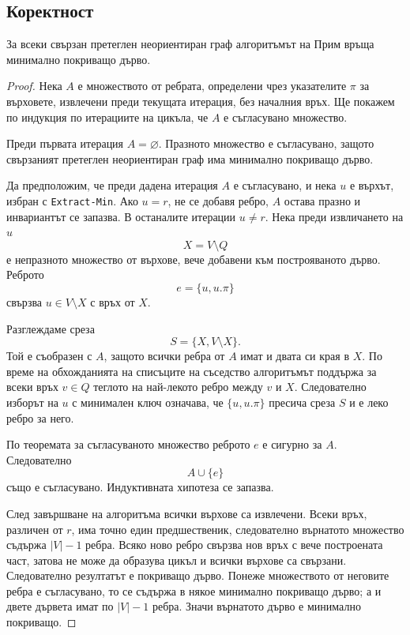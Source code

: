 \subsection{Коректност}\label{s:7.3.5}

\begin{keythm}
За всеки свързан претеглен неориентиран граф алгоритъмът на Прим връща минимално покриващо дърво.
\end{keythm}

\begin{proof}
Нека $A$ е множеството от ребрата, определени чрез указателите $\pi$ за върховете, извлечени преди текущата итерация, без началния връх. Ще покажем по индукция по итерациите на цикъла, че $A$ е съгласувано множество.

Преди първата итерация $A=\varnothing$. Празното множество е съгласувано, защото свързаният претеглен неориентиран граф има минимално покриващо дърво.

Да предположим, че преди дадена итерация $A$ е съгласувано, и нека $u$ е върхът, избран с \verb|Extract-Min|. Ако $u=r$, не се добавя ребро, $A$ остава празно и инвариантът се запазва. В останалите итерации $u\neq r$. Нека преди извличането на $u$
\[
X=V\setminus Q
\]
е непразното множество от върхове, вече добавени към построяваното дърво. Реброто
\[
e=\{u,u.\pi\}
\]
свързва $u\in V\setminus X$ с връх от $X$.

Разглеждаме среза
\[
S=\{X,V\setminus X\}.
\]
Той е съобразен с $A$, защото всички ребра от $A$ имат и двата си края в $X$. По време на обхожданията на списъците на съседство алгоритъмът поддържа за всеки връх $v\in Q$ теглото на най-лекото ребро между $v$ и $X$. Следователно изборът на $u$ с минимален ключ означава, че $\{u,u.\pi\}$ пресича среза $S$ и е леко ребро за него.

По теоремата за съгласуваното множество реброто $e$ е сигурно за $A$. Следователно
\[
A\cup\{e\}
\]
също е съгласувано. Индуктивната хипотеза се запазва.

След завършване на алгоритъма всички върхове са извлечени. Всеки връх, различен от $r$, има точно един предшественик, следователно върнатото множество съдържа $|V|-1$ ребра. Всяко ново ребро свързва нов връх с вече построената част, затова не може да образува цикъл и всички върхове са свързани. Следователно резултатът е покриващо дърво. Понеже множеството от неговите ребра е съгласувано, то се съдържа в някое минимално покриващо дърво; а и двете дървета имат по $|V|-1$ ребра. Значи върнатото дърво е минимално покриващо.
\end{proof}

